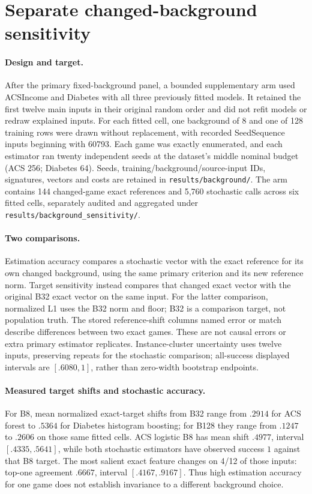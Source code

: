 \section{Separate changed-background sensitivity}
\label{app:background}

\paragraph{Design and target.}
After the primary fixed-background panel, a bounded supplementary arm used ACSIncome and Diabetes with all three previously fitted models. It retained the first twelve main inputs in their original random order and did not refit models or redraw explained inputs. For each fitted cell, one background of 8 and one of 128 training rows were drawn without replacement, with recorded SeedSequence inputs beginning with 60793. Each game was exactly enumerated, and each estimator ran twenty independent seeds at the dataset's middle nominal budget (ACS 256; Diabetes 64). Seeds, training/background/source-input IDs, signatures, vectors and costs are retained in \texttt{results/background/}. The arm contains 144 changed-game exact references and 5,760 stochastic calls across six fitted cells, separately audited and aggregated under \texttt{results/background\_sensitivity/}.

\paragraph{Two comparisons.}
Estimation accuracy compares a stochastic vector with the exact reference for its own changed background, using the same primary criterion and its new reference norm. Target sensitivity instead compares that changed exact vector with the original B32 exact vector on the same input. For the latter comparison, normalized L1 uses the B32 norm and floor; B32 is a comparison target, not population truth. The stored reference-shift columns named error or match describe differences between two exact games. These are not causal errors or extra primary estimator replicates. Instance-cluster uncertainty uses twelve inputs, preserving repeats for the stochastic comparison; all-success displayed intervals are $[.6080,1]$, rather than zero-width bootstrap endpoints.

\paragraph{Measured target shifts and stochastic accuracy.}
For B8, mean normalized exact-target shifts from B32 range from $.2914$ for ACS forest to $.5364$ for Diabetes histogram boosting; for B128 they range from $.1247$ to $.2606$ on those same fitted cells. ACS logistic B8 has mean shift $.4977$, interval $[.4335,.5641]$, while both stochastic estimators have observed success $1$ against that B8 target. The most salient exact feature changes on 4/12 of those inputs: top-one agreement $.6667$, interval $[.4167,.9167]$. Thus high estimation accuracy for one game does not establish invariance to a different background choice.

